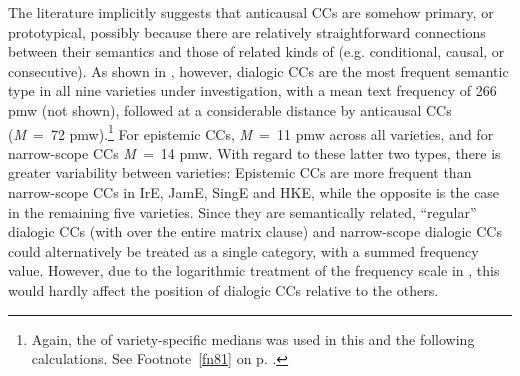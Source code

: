 The literature implicitly suggests that anticausal CCs are somehow primary, or prototypical, possibly because there are relatively straightforward connections between their semantics and those of related kinds of  (e.g. conditional, causal, or consecutive). As shown in , however, dialogic CCs are the most frequent semantic type in all nine varieties under investigation, with a mean text frequency of 266 pmw (not shown), followed at a considerable distance by anticausal CCs (\textit{M}~=~72 pmw).\footnote{Again, the  of variety-specific medians was used in this and the following calculations. See Footnote~\ref{fn81} on p. \pageref{fn81}.} For epistemic CCs, \textit{M}~=~11 pmw across all varieties, and for narrow-scope CCs \textit{M}~=~14 pmw. With regard to these latter two types, there is greater variability between varieties: Epistemic CCs are more frequent than narrow-scope CCs in IrE, JamE, SingE and HKE, while the opposite is the case in the remaining five varieties. Since they are semantically related, “regular” dialogic CCs (with  over the entire matrix clause) and narrow-scope dialogic CCs could alternatively be treated as a single category, with a summed frequency value. However, due to the logarithmic treatment of the frequency scale in , this would hardly affect the position of dialogic CCs relative to the others.

